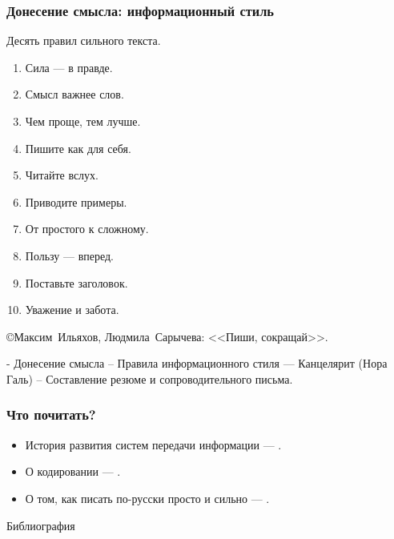 \begin{frame}
    \frametitle{Донесение смысла: информационный стиль}

    Десять правил сильного текста.
    \begin{enumerate}
        \item Сила --- в правде.
        \item Смысл важнее слов.
        \item Чем проще, тем лучше.
        \item Пишите как для себя.
        \item Читайте вслух.
        \item Приводите примеры.
        \item От простого к сложному.
        \item Пользу --- вперед.
        \item Поставьте заголовок.
        \item Уважение и забота.
    \end{enumerate}
    
    \begin{flushright}
        \copyright Максим~Ильяхов, Людмила~Сарычева: <<Пиши, сокращай>>.
    \end{flushright}
\end{frame}

- Донесение смысла
 -- Правила информационного стиля
  --- Канцелярит (Нора Галь)
 -- Составление резюме и сопроводительного письма.


\appendix

\begin{frame}
    \frametitle{Что почитать?}

    \begin{itemize}
        \item История развития систем передачи информации --- \cite{bib:souchek:noGolos}.
        \item О кодировании --- \cite{bib:petzold:code}.
        \item О том, как писать по-русски просто и сильно --- \cite{bib:gal:WordLiveAndDeath,bib:iliahov:writeShorter}.
    \end{itemize}
\end{frame}

\begin{frame}[allowframebreaks]{Библиография}
    
    
\end{frame}

